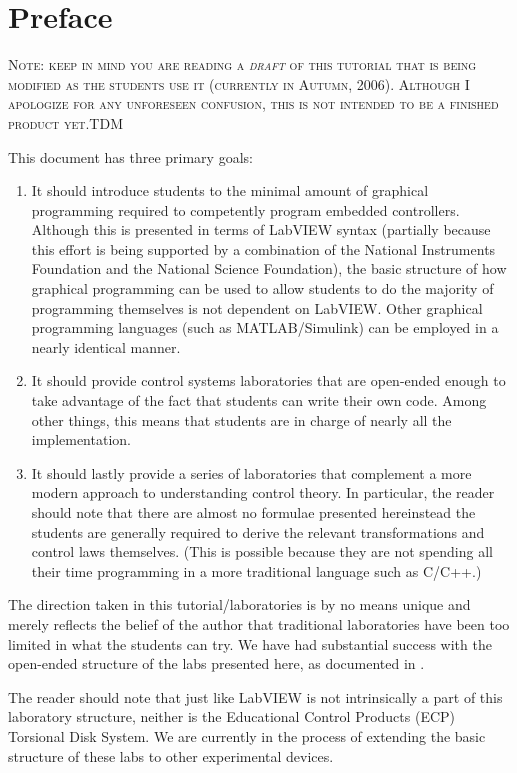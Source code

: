 \chapter*{Preface}  

\textsc{Note: keep in mind you are reading a \emph{draft} of this tutorial that is being
modified as the students use it (currently in Autumn, 2006).  Although I
apologize for any unforeseen confusion, this is not intended to be a finished
product yet.\textendash TDM}


This document has three primary goals:
\begin{enumerate}
\item It should introduce students to the minimal amount of graphical programming required
  to competently program embedded controllers.  Although this is presented in
  terms of LabVIEW syntax (partially because this effort is being supported by a
  combination of the National Instruments Foundation and the National Science
  Foundation), the basic structure of how graphical programming can be used to
  allow students to do the majority of programming themselves is not dependent
  on LabVIEW.  Other graphical programming languages (such as MATLAB/Simulink)
  can be employed in a nearly identical manner.
\item It should provide control systems laboratories that are open-ended enough
  to take advantage of the fact that students can write their own code.  Among
  other things, this means that students are in charge of nearly all the
  implementation.
\item It should lastly provide a series of laboratories that complement a more
  modern approach to understanding control theory.  In particular, the reader
  should note that there are almost no formulae presented here\textendash instead the
  students are generally required to derive the relevant transformations and
  control laws themselves.  (This is possible because they are not spending all
  their time programming in a more traditional language such as C/C++.)
\end{enumerate}
The direction taken in this tutorial/laboratories is by no means unique and
merely reflects the belief of the author that traditional laboratories have been
too limited in what the students can try.  We have had substantial success with
the open-ended structure of the labs presented here, as documented in
\cite{murphey-ace2006}.

The reader should note that just like LabVIEW is not intrinsically a part of
this laboratory structure, neither is the Educational Control Products (ECP)
Torsional Disk System.  We are currently in the process of extending the basic
structure of these labs to other experimental devices.  



